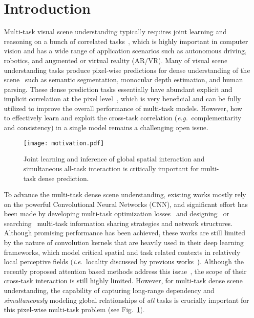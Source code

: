 \documentclass[runningheads]{llncs}
\newcommand*{\eg}{\emph{e.g.}}
\newcommand*{\ie}{\emph{i.e.}}
\begin{document}
\section{Introduction}
Multi-task visual scene understanding typically requires joint learning and reasoning on a bunch of correlated tasks~\cite{mtlsurvey}, which is highly important in computer vision and has a wide range of application scenarios such as autonomous driving, robotics, and augmented or virtual reality (AR/VR). Many of visual scene understanding tasks produce pixel-wise predictions for dense understanding of the scene~\cite{kendall2018multi} such as semantic segmentation, monocular depth estimation, and human parsing. These dense prediction tasks essentially have abundant explicit and implicit correlation at the pixel level~\cite{padnet}, which is very beneficial and can be fully utilized to improve the overall performance of multi-task models. However, how to effectively learn and exploit the cross-task correlation (\eg~complementarity and consistency) in a single model remains a challenging open issue.


\begin{figure}[!t]
    \centering
    \texttt{[image: motivation.pdf]}
    \vspace{-8pt}
    \caption{Joint learning and inference of global spatial interaction and simultaneous all-task interaction is critically important for multi-task dense prediction.}
    \vspace{-22pt}
    \label{fig:multi-task contexts}
\end{figure}

\par To advance the multi-task dense scene understanding, existing works mostly rely on the powerful Convolutional Neural Networks (CNN), and significant effort has been made by developing multi-task optimization losses~\cite{kendall2018multi} and designing~\cite{padnet} or searching~\cite{gao2020mtl} multi-task information sharing strategies and network structures. Although promising performance has been achieved, these works are still limited by the nature of convolution kernels that are heavily used in their deep learning frameworks, which model critical spatial and task related contexts in relatively local perceptive fields (\ie~locality discussed by previous works~\cite{NonLocal2018,attn_aug}).
Although the recently proposed attention based methods address this issue~\cite{papnet,psd,atrc}, the scope of their cross-task interaction is still highly limited. However, for multi-task dense scene understanding, the capability of capturing long-range dependency and \emph{simultaneously} modeling global relationships of \emph{all} tasks is crucially important for this pixel-wise multi-task problem (see Fig.~\ref{fig:multi-task contexts}).
\end{document}

